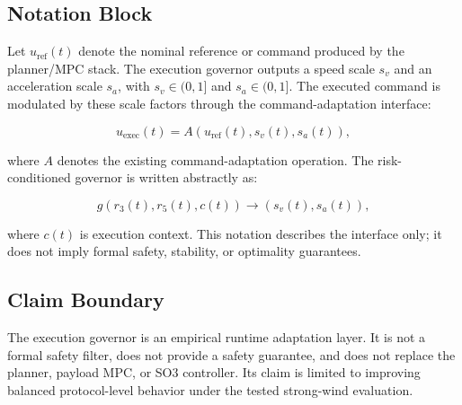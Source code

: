 \subsection{Notation Block}

Let $u_{\mathrm{ref}}(t)$ denote the nominal reference or command produced by
the planner/MPC stack. The execution governor outputs a speed scale $s_v$ and
an acceleration scale $s_a$, with $s_v \in (0,1]$ and $s_a \in (0,1]$. The
executed command is modulated by these scale factors through the
command-adaptation interface:

\begin{equation}
u_{\mathrm{exec}}(t) = A(u_{\mathrm{ref}}(t), s_v(t), s_a(t)),
\end{equation}

where $A$ denotes the existing command-adaptation operation. The
risk-conditioned governor is written abstractly as:

\begin{equation}
g(r_3(t), r_5(t), c(t)) \rightarrow (s_v(t), s_a(t)),
\end{equation}

where $c(t)$ is execution context. This notation describes the interface only;
it does not imply formal safety, stability, or optimality guarantees.

\subsection{Claim Boundary}

The execution governor is an empirical runtime adaptation layer. It is not a
formal safety filter, does not provide a safety guarantee, and does not replace
the planner, payload MPC, or SO3 controller. Its claim is limited to improving
balanced protocol-level behavior under the tested strong-wind evaluation.
